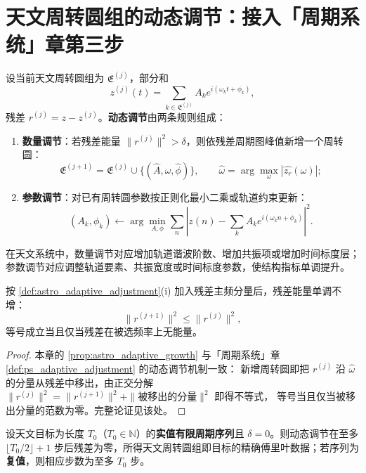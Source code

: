 \section{天文周转圆组的动态调节：接入「周期系统」章第三步}
\label{sec:astro_adaptive}

\begin{definition}[天文周转圆组的动态调节]\label{def:astro_adaptive_adjustment}
设当前天文周转圆组为 \(\mathfrak E^{(j)}\)，部分和
\[
z^{(j)}(t)=\sum_{k\in\mathfrak E^{(j)}}A_k e^{i(\omega_k t+\phi_k)},
\]
残差 \(r^{(j)}=z-z^{(j)}\)。\textbf{动态调节}由两条规则组成：
\begin{enumerate}[label=(\roman*)]
    \item \textbf{数量调节}：若残差能量 \(\|r^{(j)}\|^2>\delta\)，则依残差周期图峰值新增一个周转圆：
    \[
    \mathfrak E^{(j+1)}=\mathfrak E^{(j)}\cup\{(\hat A,\hat\omega,\hat\phi)\},\qquad
    \hat\omega=\arg\max_\omega|\widehat{z_r}(\omega)|;
    \]
    \item \textbf{参数调节}：对已有周转圆参数按正则化最小二乘或轨道约束更新：
    \[
    (A_k,\phi_k)\leftarrow\arg\min_{A,\phi}\sum_n\left|z(n)-\sum_kA_ke^{i(\omega_kn+\phi_k)}\right|^2.
    \]
\end{enumerate}
在天文系统中，数量调节对应增加轨道谐波阶数、增加共振项或增加时间标度层；参数调节对应调整轨道要素、共振宽度或时间标度参数，使结构指标单调提升。
\end{definition}

\begin{proposition}[数量调节的单调性]\label{prop:astro_adaptive_growth}
按 \cref{def:astro_adaptive_adjustment}(i) 加入残差主频分量后，残差能量单调不增：
\[
\|r^{(j+1)}\|^2\le\|r^{(j)}\|^2,
\]
等号成立当且仅当残差在被选频率上无能量。
\end{proposition}

\begin{proof}
本章的 \cref{prop:astro_adaptive_growth} 与「周期系统」章 \cref{def:ps_adaptive_adjustment} 的动态调节机制一致：
新增周转圆即把 $r^{(j)}$ 沿 $\hat\omega$ 的分量从残差中移出，由正交分解
$\|r^{(j)}\|^2=\|r^{(j+1)}\|^2+\|\text{被移出的分量}\|^2$ 即得不等式，
等号当且仅当被移出分量的范数为零。完整论证见该处。
\end{proof}

\begin{theorem}[动态调节的收敛性]\label{thm:astro_adaptive_convergence}
设天文目标为长度 $T_0$（$T_0\in\mathbb N$）的\textbf{实值有限周期序列}且 $\delta=0$。则动态调节在至多 $\lfloor T_0/2\rfloor+1$ 步后残差为零，所得天文周转圆组即目标的精确傅里叶数据；若序列为\textbf{复值}，则相应步数为至多 $T_0$ 步。
\end{theorem}

